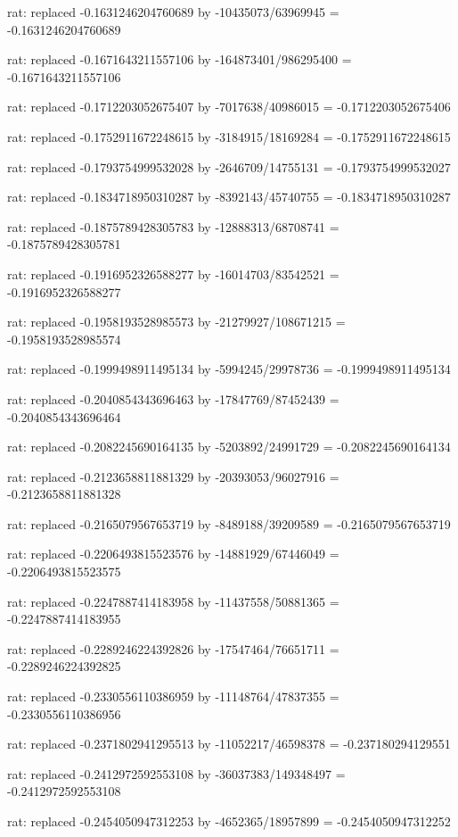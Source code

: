 \documentclass[a4paper,10pt]{article}
\begin{document}
\begin{eulernotebook}
\begin{eulercomment}
\begin{eulercomment}
\begin{eulercomment}
\begin{eulercomment}
\begin{eulercomment}
\begin{eulercomment}
\begin{eulercomment}
\begin{eulercomment}
\begin{eulercomment}
\begin{eulercomment}
\begin{eulercomment}
\begin{eulercomment}
\begin{eulercomment}
\begin{eulercomment}
\begin{eulercomment}
\begin{eulercomment}
\begin{euleroutput}
  rat: replaced -0.1631246204760689 by -10435073/63969945 = -0.1631246204760689
  
  rat: replaced -0.1671643211557106 by -164873401/986295400 = -0.1671643211557106
  
  rat: replaced -0.1712203052675407 by -7017638/40986015 = -0.1712203052675406
  
  rat: replaced -0.1752911672248615 by -3184915/18169284 = -0.1752911672248615
  
  rat: replaced -0.1793754999532028 by -2646709/14755131 = -0.1793754999532027
  
  rat: replaced -0.1834718950310287 by -8392143/45740755 = -0.1834718950310287
  
  rat: replaced -0.1875789428305783 by -12888313/68708741 = -0.1875789428305781
  
  rat: replaced -0.1916952326588277 by -16014703/83542521 = -0.1916952326588277
  
  rat: replaced -0.1958193528985573 by -21279927/108671215 = -0.1958193528985574
  
  rat: replaced -0.1999498911495134 by -5994245/29978736 = -0.1999498911495134
  
  rat: replaced -0.2040854343696463 by -17847769/87452439 = -0.2040854343696464
  
  rat: replaced -0.2082245690164135 by -5203892/24991729 = -0.2082245690164134
  
  rat: replaced -0.2123658811881329 by -20393053/96027916 = -0.2123658811881328
  
  rat: replaced -0.2165079567653719 by -8489188/39209589 = -0.2165079567653719
  
  rat: replaced -0.2206493815523576 by -14881929/67446049 = -0.2206493815523575
  
  rat: replaced -0.2247887414183958 by -11437558/50881365 = -0.2247887414183955
  
  rat: replaced -0.2289246224392826 by -17547464/76651711 = -0.2289246224392825
  
  rat: replaced -0.2330556110386959 by -11148764/47837355 = -0.2330556110386956
  
  rat: replaced -0.2371802941295513 by -11052217/46598378 = -0.237180294129551
  
  rat: replaced -0.2412972592553108 by -36037383/149348497 = -0.2412972592553108
  
  rat: replaced -0.2454050947312253 by -4652365/18957899 = -0.2454050947312252
  

\end{euleroutput}
\end{eulercomment}
\end{eulercomment}
\end{eulercomment}
\end{eulercomment}
\end{eulercomment}
\end{eulercomment}
\end{eulercomment}
\end{eulercomment}
\end{eulercomment}
\end{eulercomment}
\end{eulercomment}
\end{eulercomment}
\end{eulercomment}
\end{eulercomment}
\end{eulercomment}
\end{eulercomment}
\end{eulernotebook}
\end{document}
